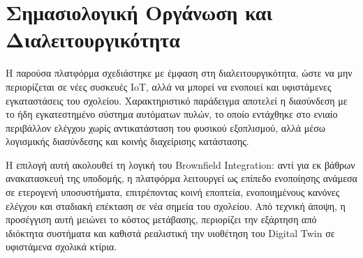 \section{Σημασιολογική Οργάνωση και Διαλειτουργικότητα}
Η παρούσα πλατφόρμα σχεδιάστηκε με έμφαση στη διαλειτουργικότητα, ώστε να μην περιορίζεται σε νέες συσκευές \textlatin{IoT}, αλλά να μπορεί να ενοποιεί και υφιστάμενες εγκαταστάσεις του σχολείου. Χαρακτηριστικό παράδειγμα αποτελεί η διασύνδεση με το ήδη εγκατεστημένο σύστημα αυτόματων πυλών, το οποίο εντάχθηκε στο ενιαίο περιβάλλον ελέγχου χωρίς αντικατάσταση του φυσικού εξοπλισμού, αλλά μέσω λογισμικής διασύνδεσης και κοινής διαχείρισης κατάστασης.

Η επιλογή αυτή ακολουθεί τη λογική του \textlatin{Brownfield Integration}: αντί για εκ βάθρων ανακατασκευή της υποδομής, η πλατφόρμα λειτουργεί ως επίπεδο ενοποίησης ανάμεσα σε ετερογενή υποσυστήματα, επιτρέποντας κοινή εποπτεία, ενοποιημένους κανόνες ελέγχου και σταδιακή επέκταση σε νέα σημεία του σχολείου. Από τεχνική άποψη, η προσέγγιση αυτή μειώνει το κόστος μετάβασης, περιορίζει την εξάρτηση από ιδιόκτητα συστήματα και καθιστά ρεαλιστική την υιοθέτηση του \textlatin{Digital Twin} σε υφιστάμενα σχολικά κτίρια.





